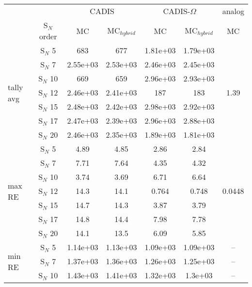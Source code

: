 \begin{tabular}{lc|ccccc}
\toprule
{} & {} & \multicolumn{2}{c}{CADIS}  & \multicolumn{2}{c}{CADIS-$\Omega$}  & analog \\
{} &  S$_N$ order &     MC  &   MC$_{hybrid}$ & MC & MC$_{hybrid}$ &  MC \\
\midrule
\multirow{7}{*}{tally avg} &  S$_N$ 5 &        683 &       677 &   1.81e+03 &
1.79e+03 &  \multirow{7}{*}{1.39} \\
      {}     &  S$_N$ 7 &   2.55e+03 &  2.53e+03 &   2.46e+03 &     2.45e+03 &    {}   \\
      {}     & S$_N$ 10 &        669 &       659 &   2.96e+03 &     2.93e+03 &    {}   \\
      {}     & S$_N$ 12 &   2.46e+03 &  2.41e+03 &        187 &          183 &    {}   \\
      {}     & S$_N$ 15 &   2.48e+03 &  2.42e+03 &   2.98e+03 &     2.92e+03 &    {}   \\
      {}     & S$_N$ 17 &   2.47e+03 &  2.39e+03 &   2.96e+03 &     2.88e+03 &    {}   \\
      {}     & S$_N$ 20 &   2.46e+03 &  2.35e+03 &   1.89e+03 &     1.81e+03 &    {}   \\
\midrule
\multirow{7}{*}{max RE}  &  S$_N$ 5 &       4.89 &      4.85 &       2.86 &
2.84 &  \multirow{7}{*}{0.0448} \\
      {}     &  S$_N$ 7 &       7.71 &      7.64 &       4.35 &         4.32 &    {}   \\
      {}     & S$_N$ 10 &       3.74 &      3.69 &       6.71 &         6.64 &    {}   \\
      {}     & S$_N$ 12 &       14.3 &      14.1 &      0.764 &        0.748 &    {}   \\
      {}     & S$_N$ 15 &       14.7 &      14.3 &       3.87 &         3.79 &    {}   \\
      {}     & S$_N$ 17 &       14.8 &      14.4 &       7.98 &         7.78 &    {}   \\
      {}     & S$_N$ 20 &       14.1 &      13.5 &       6.09 &         5.85 &    {}   \\
\midrule
\multirow{7}{*}{min RE}  &  S$_N$ 5 &   1.14e+03 &  1.13e+03 &   1.09e+03 &     1.09e+03 &      -- \\
      {}     &  S$_N$ 7 &   1.37e+03 &  1.36e+03 &   1.26e+03 &     1.25e+03 &      -- \\
      {}     & S$_N$ 10 &   1.43e+03 &  1.41e+03 &   1.32e+03 &      1.3e+03 &      -- \\

\end{tabular}
